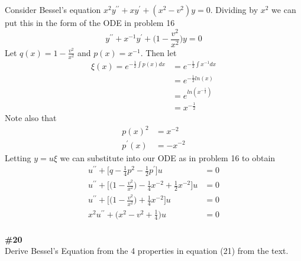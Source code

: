 \documentclass[12pt]{article}
\newcommand{\problem}[1]{\hspace{-4 ex} \large \textbf{#1}\\}
\begin{document}
	Consider Bessel's equation $x^2y^{\prime\prime} + xy^\prime + (x^2-v^2)y = 0$. Dividing by $x^2$ we can put this in the form of the ODE in problem 16
	$$
	y^{\prime\prime} + x^{-1}y^\prime + \Big(1-\frac{v^2}{x^2} \Big)y = 0
	$$
	Let $q(x) = 1-\frac{v^2}{x^2}$ and $p(x) = x^{-1}$. Then let
	\begin{align*}
		\xi(x) = e^{-\frac{1}{2}\int p(x)dx} & = e^{-\frac{1}{2}\int x^{-1}dx} \\
		& = e^{-\frac{1}{2}ln(x)} \\
		& = e^{ln(x^{-\frac{1}{2}})} \\
		& = x^{-\frac{1}{2}}
	\end{align*}
	Note also that
	\begin{align*}
		p(x)^2 & = x^{-2} \\
		p^\prime(x) & = -x^{-2}
	\end{align*}
	Letting $y = u\xi$ we can substitute into our ODE as in problem 16 to obtain
	\begin{align*}
		u^{\prime\prime} + \Big[ q  - \frac{1}{4}p^2 - \frac{1}{2}p^\prime \Big]u  & = 0 \\
		u^{\prime\prime} + \Big[ \Big(1-\frac{v^2}{x^2} \Big)  - \frac{1}{4}x^{-2} + \frac{1}{2}x^{-2} \Big]u  & = 0 \\
		u^{\prime\prime} + \Big[ \Big(1-\frac{v^2}{x^2} \Big)  + \frac{1}{4}x^{-2} \Big]u  & = 0 \\
		x^2u^{\prime\prime} + \Big(x^2-v^2 + \frac{1}{4} \Big)u  & = 0 \\
	\end{align*}
	
\problem{\#20}Derive Bessel's Equation from the 4 properties in equation (21) from the text.
	
\end{document}

